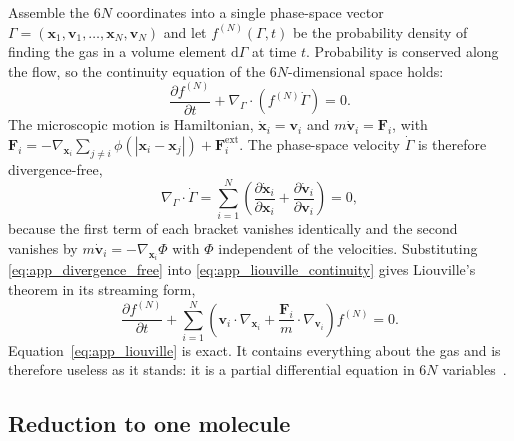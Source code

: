 Assemble the $6N$ coordinates into a single phase-space vector $\Gamma = (\mathbf{x}_1,\mathbf{v}_1,\dots,\mathbf{x}_N,\mathbf{v}_N)$ and let $f^{(N)}(\Gamma,t)$ be the probability density of finding the gas in a volume element $\mathrm{d}\Gamma$ at time $t$. Probability is conserved along the flow, so the continuity equation of the $6N$-dimensional space holds:
\begin{equation}
    \frac{\partial f^{(N)}}{\partial t} + \nabla_\Gamma \cdot \left(f^{(N)}\dot{\Gamma}\right) = 0 .
    \label{eq:app_liouville_continuity}
\end{equation}
The microscopic motion is Hamiltonian, $\dot{\mathbf{x}}_i = \mathbf{v}_i$ and $m\dot{\mathbf{v}}_i = \mathbf{F}_i$, with $\mathbf{F}_i = -\nabla_{\mathbf{x}_i}\sum_{j\neq i}\phi(|\mathbf{x}_i-\mathbf{x}_j|) + \mathbf{F}^{\mathrm{ext}}_i$. The phase-space velocity $\dot{\Gamma}$ is therefore divergence-free,
\begin{equation}
    \nabla_\Gamma \cdot \dot{\Gamma} = \sum_{i=1}^{N}\left(\frac{\partial \dot{\mathbf{x}}_i}{\partial \mathbf{x}_i} + \frac{\partial \dot{\mathbf{v}}_i}{\partial \mathbf{v}_i}\right) = 0 ,
    \label{eq:app_divergence_free}
\end{equation}
because the first term of each bracket vanishes identically and the second vanishes by $m\dot{\mathbf{v}}_i = -\nabla_{\mathbf{x}_i}\Phi$ with $\Phi$ independent of the velocities. Substituting \eqref{eq:app_divergence_free} into \eqref{eq:app_liouville_continuity} gives Liouville's theorem in its streaming form,
\begin{equation}
    \frac{\partial f^{(N)}}{\partial t} + \sum_{i=1}^{N}\left(\mathbf{v}_i\cdot\nabla_{\mathbf{x}_i} + \frac{\mathbf{F}_i}{m}\cdot\nabla_{\mathbf{v}_i}\right) f^{(N)} = 0 .
    \label{eq:app_liouville}
\end{equation}
Equation~\eqref{eq:app_liouville} is exact. It contains everything about the gas and is therefore useless as it stands: it is a partial differential equation in $6N$ variables~\cite{cercignani1988}.

\subsection{Reduction to one molecule}

